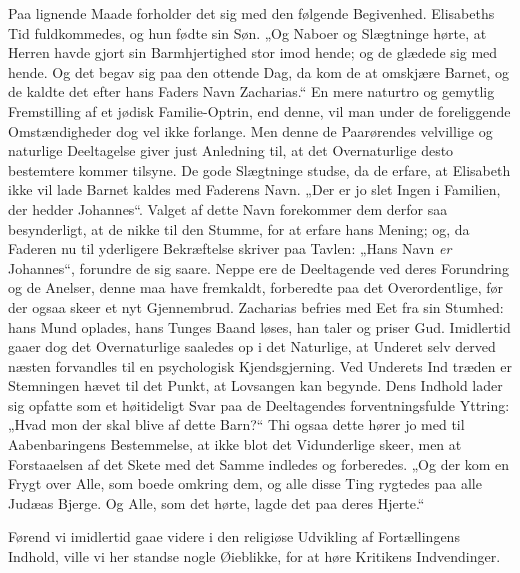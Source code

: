 \documentclass[12pt,a4paper]{book}
\begin{document}
Paa lignende Maade forholder det sig med den følgende Begivenhed. Elisabeths Tid
fuldkommedes, og hun fødte sin Søn. „Og Naboer og Slægtninge hørte, at Herren
havde gjort sin Barmhjertighed stor imod hende; og de glædede sig med hende. Og
det begav sig paa den ottende Dag, da kom de at omskjære Barnet, og de kaldte
det efter hans Faders Navn Zacharias.“ En mere naturtro og gemytlig Fremstilling
af et jødisk Familie-Optrin, end denne, vil man under de foreliggende
Omstændigheder dog vel ikke forlange. Men denne de Paarørendes velvillige og
naturlige Deeltagelse giver just Anledning til, at det Overnaturlige desto
bestemtere kommer tilsyne. De gode Slægtninge studse, da de erfare, at Elisabeth
ikke vil lade Barnet kaldes med Faderens Navn. „Der er jo slet Ingen i Familien,
der hedder Johannes“. Valget af dette Navn forekommer dem derfor saa
besynderligt, at de nikke til den Stumme, for at erfare hans Mening; og, da
Faderen nu til yderligere Bekræftelse skriver paa Tavlen:
„Hans Navn \emph{er} Johannes“, forundre de sig saare. Neppe ere de Deeltagende
ved deres Forundring og de Anelser, denne maa have fremkaldt, forberedte paa det
Overordentlige, før der ogsaa skeer et nyt Gjennembrud. Zacharias befries med
Eet fra sin Stumhed: hans Mund oplades, hans Tunges Baand løses, han taler og
priser Gud. Imidlertid gaaer dog det Overnaturlige saaledes op i det Naturlige,
at Underet selv derved næsten forvandles til en psychologisk Kjendsgjerning. Ved
Underets Ind\-%
træden er Stemningen hævet til det Punkt, at Lovsangen kan begynde. Dens Indhold
lader sig opfatte som et høitideligt Svar paa de Deeltagendes forventningsfulde
Yttring: „Hvad mon der skal blive af dette Barn?“ Thi ogsaa dette hører jo med
til Aabenbaringens Bestemmelse, at ikke blot det Vidunderlige skeer, men at
Forstaaelsen af det Skete med det Samme indledes og forberedes. „Og der kom en
Frygt over Alle, som boede omkring dem, og alle disse Ting rygtedes paa alle
Judæas Bjerge. Og Alle, som det hørte, lagde det paa deres Hjerte.“

Førend vi imidlertid gaae videre i den religiøse Udvikling af Fortællingens
Indhold, ville vi her standse nogle Øieblikke, for at høre Kritikens
Indvendinger.
\end{document}
